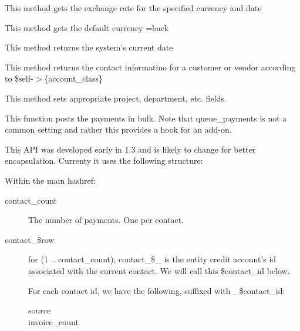 \begin{description}
\begin{description}
\begin{description}
\begin{description}
\begin{description}
\begin{description}
\begin{description}
\begin{description}
\begin{description}
\begin{description}
This method gets the exchange rate for the specified currency and date


\item[{get\_default\_currency}] \mbox{}

This method gets the default currency 
=back


\item[{get\_current\_date}] \mbox{}

This method returns the system's current date


\item[{get\_vc\_info}] \mbox{}

This method returns the contact informatino for a customer or vendor according to
\$self-$>$\{account\_class\}


\item[{get\_payment\_detail\_data}] \mbox{}

This method sets appropriate project, department, etc. fields.


\item[{post\_bulk}] \mbox{}

This function posts the payments in bulk.  Note that queue\_payments is not a 
common setting and rather this provides a hook for an add-on.



This API was developed early in 1.3 and is likely to change for better 
encapsulation.  Currenty it uses the following structure:



Within the main hashref:

\begin{description}

\item[{contact\_count}] \mbox{}

The number of payments.  One per contact.


\item[{contact\_\$row}] \mbox{}

for (1 .. contact\_count), contact\_\$\_ is the entity credit account's id 
associated with the current contact.  We will call this \$contact\_id below.



For each contact id, we have the following, suffixed with \_\$contact\_id:

\begin{description}

\item[{source}] \mbox{}
\item[{invoice\_count}] \mbox{}


\end{description}
\end{description}
\end{description}
\end{description}
\end{description}
\end{description}
\end{description}
\end{description}
\end{description}
\end{description}
\end{description}
\end{description}
